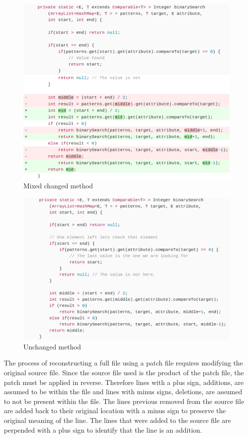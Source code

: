 \begin{figure}[!ht]
    \centering
        \includegraphics[width=1.0\textwidth]{images/simple_complex}
    \caption{Mixed changed method}
    \label{fig:changed_method}
\end{figure}

\begin{figure}[!ht]
    \centering
        \includegraphics[width=1.0\textwidth]{images/unchanged_example}
    \caption{Unchanged method}
    \label{fig:unchanged_method}
\end{figure}

The process of reconstructing a full file using a patch file requires modifying the original source file. Since the source file used is the product of the patch file, the patch must be applied in reverse. Therefore lines with a plus sign, additions, are assumed to be within the file and lines with minus signs, deletions, are assumed to not be present within the file. The lines previous removed from the source file are added back to their original location with a minus sign to preserve the original meaning of the line. The lines that were added to the source file are perpended with a plus sign to identify that the line is an addition.

